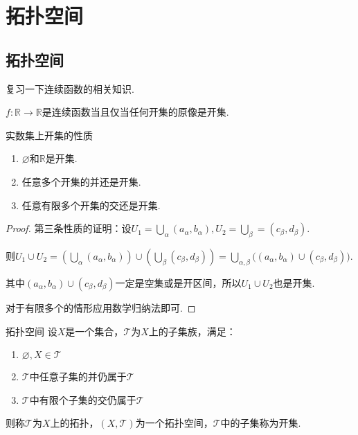 \chapter{拓扑空间}

\section{拓扑空间}

复习一下连续函数的相关知识.

\begin{theorem}{}
    $f:\mathbb{R}\to\mathbb{R}$是连续函数当且仅当任何开集的原像是开集.
\end{theorem}


\begin{proposition}{实数集上开集的性质}
    \begin{enumerate}
        \item $\varnothing$和$\mathbb{R}$是开集.
        \item 任意多个开集的并还是开集.
        \item 任意有限多个开集的交还是开集.
    \end{enumerate}
\end{proposition}
\begin{proof}
    第三条性质的证明：设$U_1=\bigcup_\alpha{(a_\alpha,b_\alpha)},U_2=\bigcup_\beta=(c_\beta,d_\beta)$.\par
    则$U_1\cup U_2=\left(\bigcup_\alpha{(a_\alpha,b_\alpha)}\right)\cup\left(\bigcup_\beta{(c_\beta,d_\beta)}\right) = \bigcup_{\alpha,\beta}\big((a_\alpha,b_\alpha)\cup(c_\beta,d_\beta)\big)$.\par
    其中$(a_\alpha,b_\alpha)\cup(c_\beta,d_\beta)$一定是空集或是开区间，所以$U_1\cup U_2$也是开集.\par
    对于有限多个的情形应用数学归纳法即可.\par
\end{proof}

\begin{definition}{拓扑空间}
    设$X$是一个集合，$\mathcal{T}$为$X$上的子集族，满足：
    \begin{enumerate}
        \item $\varnothing,X\in\mathcal{T}$
        \item $\mathcal{T}$中任意子集的并仍属于$\mathcal{T}$
        \item $\mathcal{T}$中有限个子集的交仍属于$\mathcal{T}$
    \end{enumerate}
    则称$\mathcal{T}$为$X$上的拓扑，$(X,\mathcal{T})$为一个拓扑空间，$\mathcal{T}$中的子集称为开集.
\end{definition}


